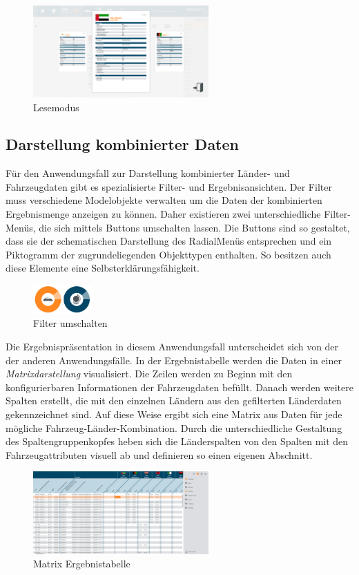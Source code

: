 \begin{figure}[H]
 \centering
 \includegraphics[width=0.6\textwidth]{grafiken/readmode.png}
 \caption{Lesemodus}
 \label{fig:readmode}
\end{figure}
\subsection{Darstellung kombinierter Daten}
Für den Anwendungsfall zur Darstellung kombinierter Länder- und Fahrzeugdaten gibt es spezialisierte Filter- und Ergebnisansichten. Der Filter muss verschiedene Modelobjekte verwalten um die Daten der kombinierten Ergebnismenge anzeigen zu können. Daher existieren zwei unterschiedliche Filter-Menüs, die sich mittels Buttons umschalten lassen. Die Buttons sind so gestaltet, dass sie der schematischen Darstellung des RadialMenüs entsprechen und ein Piktogramm der zugrundeliegenden Objekttypen enthalten. So besitzen auch diese Elemente eine Selbsterklärungsfähigkeit.
\begin{figure}[H]
 \centering
 \includegraphics[width=0.2\textwidth]{grafiken/filter_buttons.png}
 \caption{Filter umschalten}
 \label{fig:filterButtons}
\end{figure}
Die Ergebnispräsentation in diesem Anwendungsfall unterscheidet sich von der der anderen Anwendungsfälle. In der Ergebnistabelle werden die Daten in einer \textit{Matrixdarstellung} visualisiert. Die Zeilen werden zu Beginn mit den konfigurierbaren Informationen der Fahrzeugdaten befüllt. Danach werden weitere Spalten erstellt, die mit den einzelnen Ländern aus den gefilterten Länderdaten gekennzeichnet sind. Auf diese Weise ergibt sich eine Matrix aus Daten für jede mögliche Fahrzeug-Länder-Kombination. Durch die unterschiedliche Gestaltung des Spaltengruppenkopfes heben sich die Länderspalten von den Spalten mit den Fahrzeugattributen visuell ab und definieren so einen eigenen Abschnitt.
\begin{figure}[H]
 \centering
 \includegraphics[width=0.6\textwidth]{grafiken/ltue_table.png}
 \caption{Matrix Ergebnistabelle}
 \label{fig:ltueTable}
\end{figure}
